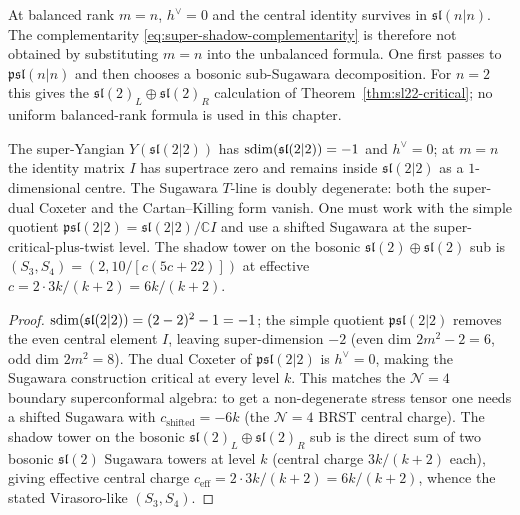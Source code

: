 \begin{remark}
\label{rem:balanced-sl-nn-max-limit}
At balanced rank $m = n$, $h^\vee = 0$ and the central identity
survives in $\mathfrak{sl}(n|n)$. The complementarity
\eqref{eq:super-shadow-complementarity} is therefore not obtained by
substituting $m=n$ into the unbalanced formula. One first passes to
$\mathfrak{psl}(n|n)$ and then chooses a bosonic sub-Sugawara
decomposition. For $n=2$ this gives the
$\mathfrak{sl}(2)_L\oplus\mathfrak{sl}(2)_R$ calculation of
Theorem~\ref{thm:sl22-critical}; no uniform balanced-rank formula is
used in this chapter.
\end{remark}

\begin{theorem}
\label{thm:sl22-critical}
The super-Yangian $Y(\mathfrak{sl}(2|2))$ has $\mathrm{sdim}(\mathfrak{sl}(2|2))
= -1$ and $h^\vee = 0$; at $m = n$ the identity matrix $I$ has
supertrace zero and remains inside $\mathfrak{sl}(2|2)$ as a
$1$-dimensional centre. The Sugawara $T$-line is doubly degenerate:
both the super-dual Coxeter and the Cartan--Killing form vanish. One
must work with the simple quotient $\mathfrak{psl}(2|2) =
\mathfrak{sl}(2|2)/\mathbb{C} I$ and use a shifted Sugawara at the
super-critical-plus-twist level. The shadow tower on the bosonic
$\mathfrak{sl}(2) \oplus \mathfrak{sl}(2)$ sub is $(S_3, S_4) = (2,
10/[c(5c+22)])$ at effective $c = 2 \cdot 3k/(k+2) = 6k/(k+2)$.
\end{theorem}

\begin{proof}[Proof]
$\mathrm{sdim}(\mathfrak{sl}(2|2)) = (2 - 2)^2 - 1 = -1$; the simple quotient
$\mathfrak{psl}(2|2)$ removes the even central element $I$, leaving
super-dimension $-2$ (even dim $2m^2 - 2 = 6$, odd dim $2m^2 = 8$).
The dual Coxeter of $\mathfrak{psl}(2|2)$ is $h^\vee = 0$, making the
Sugawara construction critical at every level $k$. This matches the
$\mathcal{N}{=}4$ boundary superconformal algebra:
to get a non-degenerate stress tensor one needs a shifted
Sugawara with $c_{\mathrm{shifted}} = -6 k$ (the $\mathcal{N}{=}4$
BRST central charge). The shadow tower on the bosonic
$\mathfrak{sl}(2)_L \oplus \mathfrak{sl}(2)_R$ sub is the direct sum
of two bosonic $\mathfrak{sl}(2)$ Sugawara towers at level $k$
(central charge $3k/(k+2)$ each), giving effective central charge
$c_{\mathrm{eff}} = 2 \cdot 3k/(k+2) = 6 k / (k + 2)$, whence the
stated Virasoro-like $(S_3, S_4)$.
\end{proof}

